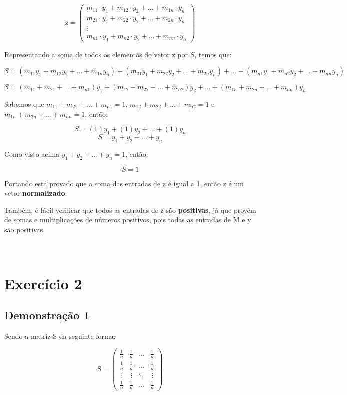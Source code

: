 \documentclass[a4paper, 12pt]{article}
\begin{document}
$$\mathrm{z}=\begin{pmatrix}
m_{11}\cdot y_1+m_{12}\cdot y_2+\dots +m_{1n}\cdot y_n\\
m_{21}\cdot y_1+m_{22}\cdot y_2+\dots +m_{2n}\cdot y_n\\
\vdots \\
m_{n1}\cdot y_1+m_{n2}\cdot y_2+\dots +m_{nn}\cdot y_n
\end{pmatrix}$$

Representando a soma de todos os elementos do vetor $\mathrm{z}$ por $S$, temos que:

\begin{footnotesize}
$$S=\left(m_{11}y_1+m_{12}y_2+\dots +m_{1n}y_n\right)+\left(m_{21}y_1+m_{22}y_2+\dots +m_{2n}y_n\right)+\dots +\left(m_{n1}y_1+m_{n2}y_2+\dots +m_{nn}y_n\right)$$
\end{footnotesize}$$S=\left(m_{11}+m_{21}+\dots+m_{n1}\right)y_1+\left(m_{12}+m_{22}+\dots+m_{n2}\right)y_2+\dots +\left(m_{1n}+m_{2n}+\dots+m_{nn}\right)y_n$$

Sabemos que $m_{11}+m_{21}+\dots+m_{n1}=1$, $m_{12}+m_{22}+\dots+m_{n2}=1$ e $m_{1n}+m_{2n}+\dots+m_{nn}=1$, então:

$$S=\left(1\right)y_1+\left(1\right)y_2+\dots +\left(1\right)y_n$$
$$S=y_1+y_2+\dots +y_n$$

Como visto acima $y_1+y_2+\dots +y_n=1$, então:

$$\boxed{\ \ S=1\ \ }$$

Portando está provado que a soma das entradas de $\mathrm{z}$ é igual a 1, então $\mathrm{z}$ é um vetor \textbf{normalizado}.

Também, é fácil verificar que todos as entradas de $\mathrm{z}$ são \textbf{positivas}, já que provém de somas e multiplicações de números positivos, pois todas as entradas de $\mathrm{M}$ e $\mathrm{y}$ são positivas.\\\\\\

\section{Exercício 2}
\subsection{Demonstração 1}
Sendo a matriz $\mathrm{S}$ da seguinte forma:

$$\mathrm{S}=\begin{pmatrix}
\frac{1}{n}&\frac{1}{n}&\dots &\frac{1}{n}\\
\frac{1}{n}&\frac{1}{n}&\dots &\frac{1}{n}\\
\ \vdots &\ \vdots &\ddots &\ \vdots \\
\frac{1}{n}&\frac{1}{n}&\dots &\frac{1}{n}
\end{pmatrix}$$
\end{document}
